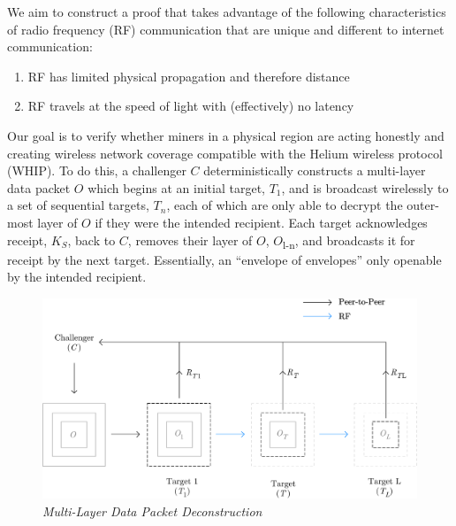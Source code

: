 \documentclass[10pt, nonatbib, nocopyrightspace, reprint]{sigplanconf}
\begin{document}
We aim to construct a proof that takes advantage of the following characteristics of radio frequency (RF) communication that are unique and different to internet communication:

\begin{enumerate}
    \item RF has limited physical propagation and therefore distance
    \item RF travels at the speed of light with (effectively) no latency
\end{enumerate}

Our goal is to verify whether miners in a physical region are acting honestly and creating wireless network coverage compatible with the Helium wireless protocol (WHIP). To do this, a challenger $C$ deterministically constructs a multi-layer data packet $O$ which begins at an initial target, $T_1$, and is broadcast wirelessly to a set of sequential targets, $T_n$, each of which are only able to decrypt the outer-most layer of $O$ if they were the intended recipient. Each target acknowledges receipt, $K_S$, back to $C$, removes their layer of $O$, $O$\textsubscript{l-n}, and broadcasts it for receipt by the next target. Essentially, an ``envelope of envelopes'' only openable by the intended recipient.

\begin{figure}[H]
    \begin{center}
          \includegraphics[width=\columnwidth]{deconstruction.eps}
          \caption{\emph{Multi-Layer Data Packet Deconstruction}}
          \label{fig:poc-deconstruction}
     \end{center}
\end{figure}
\end{document}
